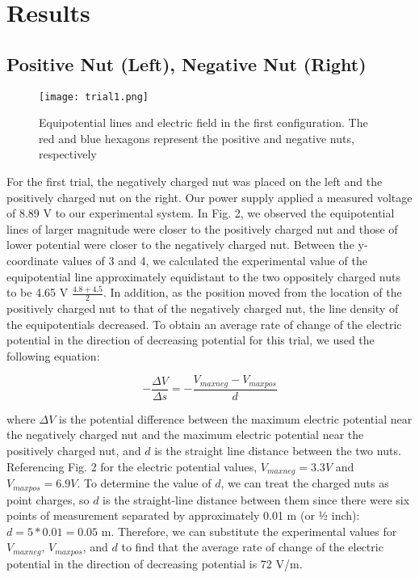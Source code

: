 \documentclass[conference]{IEEEtran}
\begin{document}
\section{Results}

\subsection{Positive Nut (Left), Negative Nut (Right)}
\begin{figure}
\centerline{\texttt{[image: trial1.png]}} %
\caption{Equipotential lines and electric field in the first configuration. The red and blue hexagons represent the positive and negative nuts, respectively}
\end{figure}

For the first trial, the negatively charged nut was placed on the left and the positively charged nut on the right. Our power supply applied a measured voltage of 8.89 V to our experimental system.
In Fig. 2, we observed the equipotential lines of larger magnitude were closer to the positively charged nut and those of lower potential were closer to the negatively charged nut. Between the y-coordinate values of 3 and 4, we calculated the experimental value of the equipotential line approximately equidistant to the two oppositely charged nuts to be 4.65 V $\frac{4.8+4.5}{2}$. In addition, as the position moved from the location of the positively charged nut to that of the negatively charged nut, the line density of the equipotentials decreased. To obtain an average rate of change of the electric potential in the direction of decreasing potential for this trial, we used the following equation:

\begin{equation}
-\frac{\Delta V}{\Delta s} = -\frac{V_{max neg} - V_{max pos}}{d}\label{eq}
\end{equation}

\noindent where $\Delta V$ is the potential difference between the maximum electric potential near the negatively charged nut and the maximum electric potential near the positively charged nut, and $d$ is the straight line distance between the two nuts. Referencing Fig. 2 for the electric potential values, $V_{max neg} = 3.3 V$ and $V_{max pos} = 6.9 V$. To determine the value of $d$, we can treat the charged nuts as point charges, so $d$ is the straight-line distance between them since there were six points of measurement separated by approximately 0.01 m (or ½ inch): $d= 5 * 0.01 = 0.05$ m. Therefore, we can substitute the experimental values for $V_{max neg}$, $V_{max pos}$, and $d$ to find that the average rate of change of the electric potential in the direction of decreasing potential is 72 V/m.
\end{document}
